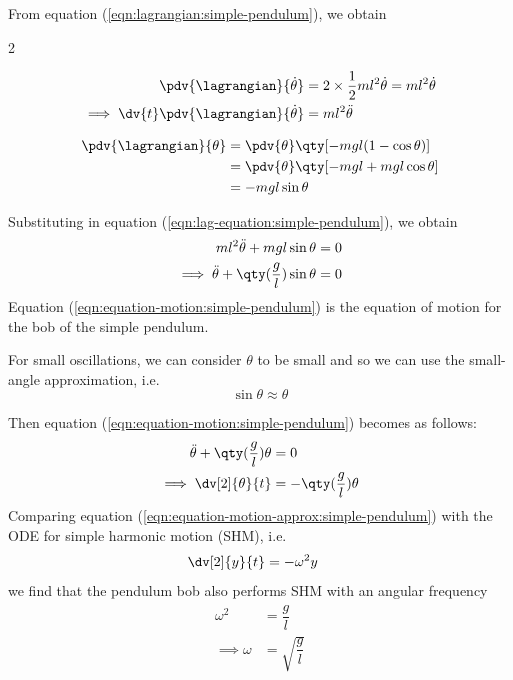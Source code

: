 \begin{enumerate}
	From equation (\ref{eqn:lagrangian:simple-pendulum}), we obtain\vspace{-3ex}
	
	\begin{multicols}{2}
		
		\setlength{\columnseprule}{0.4pt}
		
		\begin{align*}
			\pdv{\lagrangian}{\dot{\theta}}&=2\times\dfrac{1}{2}ml^2\dot{\theta}=ml^2\dot{\theta} \\
			\implies\dv{t}\pdv{\lagrangian}{\dot{\theta}}&=ml^2\ddot{\theta}
		\end{align*}
		
		\columnbreak		
		\begin{align*}
			\pdv{\lagrangian}{\theta}&=\pdv{\theta}\qty[-mgl(1-\cos{\theta})] \\
			&=\pdv{\theta}\qty[-mgl+mgl\cos{\theta}] \\
			&=-mgl\sin{\theta}
		\end{align*}
		
	\end{multicols}
	
	Substituting in equation (\ref{eqn:lag-equation:simple-pendulum}), we obtain
	\begin{align}
		ml^2\ddot{\theta}+mgl\sin{\theta}&=0 \nonumber\\
		\implies \ddot{\theta}+\qty(\dfrac{g}{l})\sin{\theta}&=0 \label{eqn:equation-motion:simple-pendulum}
	\end{align}
	Equation (\ref{eqn:equation-motion:simple-pendulum}) is the equation of motion for the bob of the simple pendulum.
	
	For small oscillations, we can consider $\theta$ to be small and so we can use the small-angle approximation, i.e.
	$$\sin{\theta}\approx\theta$$
	
	Then equation (\ref{eqn:equation-motion:simple-pendulum}) becomes as follows:
	\begin{align}
		\ddot{\theta}+\qty(\dfrac{g}{l})\theta&=0 \nonumber\\
		\implies\dv[2]{\theta}{t}&=-\qty(\dfrac{g}{l})\theta \label{eqn:equation-motion-approx:simple-pendulum}
	\end{align}
	Comparing equation (\ref{eqn:equation-motion-approx:simple-pendulum}) with the ODE for simple harmonic motion (SHM), i.e.
	\begin{align*}
		\dv[2]{y}{t}&=-\omega^2y
	\end{align*}
	we find that the pendulum bob also performs SHM with an angular frequency
	\begin{align*}
		\omega^2&=\dfrac{g}{l} \\
		\implies\omega&=\sqrt{\dfrac{g}{l}}
	\end{align*}
	

\end{enumerate}
